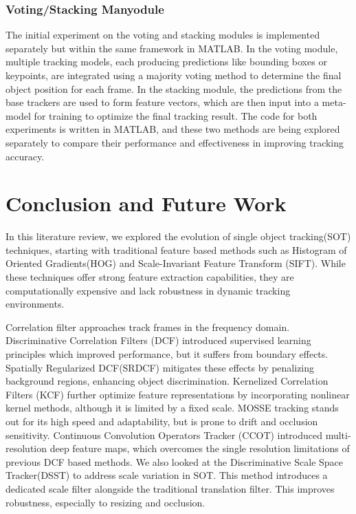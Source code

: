 \documentclass{article}
\begin{document}



\subsubsection{Voting/Stacking Manyodule}

The initial experiment on the voting and stacking modules is implemented separately but within the same framework in MATLAB. In the voting module, multiple tracking models, each producing predictions like bounding boxes or keypoints, are integrated using a majority voting method to determine the final object position for each frame. In the stacking module, the predictions from the base trackers are used to form feature vectors, which are then input into a meta-model for training to optimize the final tracking result. The code for both experiments is written in MATLAB, and these two methods are being explored separately to compare their performance and effectiveness in improving tracking accuracy.

\section{Conclusion and Future Work}

In this literature review, we explored the evolution of single object tracking(SOT) techniques, starting with traditional feature based methods such as Histogram of Oriented Gradients(HOG) and Scale-Invariant Feature Transform (SIFT). While these techniques offer strong feature extraction capabilities, they are computationally expensive and lack robustness in dynamic tracking environments.

Correlation filter approaches track frames in the frequency domain. Discriminative Correlation Filters (DCF) introduced supervised learning principles which improved performance, but it suffers from boundary effects. Spatially Regularized DCF(SRDCF) mitigates these effects by penalizing background regions, enhancing object discrimination. Kernelized Correlation Filters (KCF) further optimize feature representations by incorporating nonlinear kernel methods, although it is limited by a fixed scale. MOSSE tracking stands out for its high speed and adaptability, but is prone to drift and occlusion sensitivity. Continuous Convolution Operators Tracker (CCOT) introduced multi-resolution deep feature maps, which overcomes the single resolution limitations of previous DCF based methods. We also looked at the Discriminative Scale Space Tracker(DSST) to address scale variation in SOT. This method introduces a dedicated scale filter alongside the traditional translation filter. This improves robustness, especially to resizing and occlusion.
\end{document}

